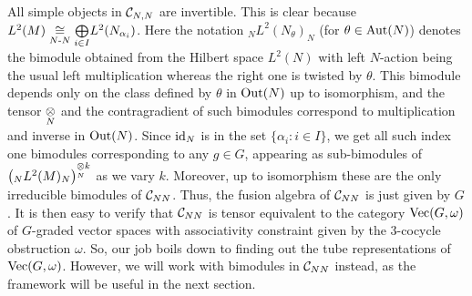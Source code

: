 All simple objects in $ \mathcal C_{N,N} $ are invertible.
This is clear because $ L^2(M) \underset{N\text{-}N }{\cong}  \underset{i\in I}{\bigoplus} L^2( N_{\alpha_i} ) $. Here the notation $_N L^2 (N_\theta)_N $ (for $ \theta \in \text{Aut} (N) $) denotes the bimodule obtained from the Hilbert space $ L^2 (N) $ with left $ N $-action being the usual left multiplication whereas the right one is twisted by $ \theta $. This bimodule depends only on the class defined by $ \theta $ in $ \text{Out} (N)$ up to isomorphism, and the tensor $ \underset{N}{\otimes} $ and the contragradient of such bimodules correspond to multiplication and inverse in $ \text{Out} (N)$.
Since $ \text{id}_N $ is in the set $\{\alpha_i : i\in I\}  $, we get all such index one bimodules corresponding to any $ g \in G $, appearing as sub-bimodules of $ \left(_N L^2(M)_N \right)^{\underset{N}{\otimes} k}  $ as we vary $ k $.
Moreover, up to isomorphism these are the only irreducible bimodules of $\mathcal C _{N N} $.
Thus, the fusion algebra of $ \mathcal C_{NN} $ is just given by $ G $.
It is then easy to verify that $ \mathcal C_{NN} $ is tensor equivalent to the category $ \text{Vec} (G, \omega) $ of $ G $-graded vector spaces with associativity constraint given by the $ 3 $-cocycle obstruction $ \omega $.
So, our job boils down to finding out the tube representations of $ \text{Vec} (G, \omega) $.
However, we will work with bimodules in $ \mathcal C_{NN} $ instead, as the framework will be useful in the next section.

